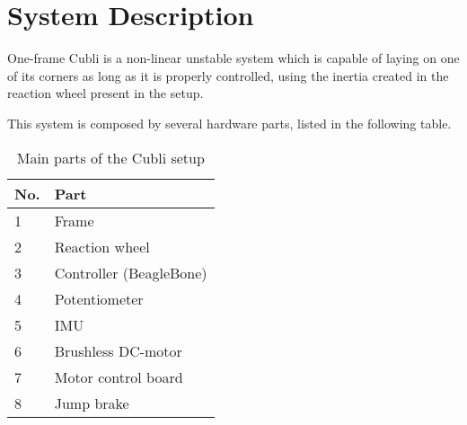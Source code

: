 \chapter{System Description}
One-frame Cubli is a non-linear unstable system which is capable of laying on one of its corners as long as it is properly controlled, using the inertia created in the reaction wheel present in the setup.

This system is composed by several hardware parts, listed in the following table.  

\begin{table}[H]
	\begin{tabular}{|l|p{4.5cm}|}
		\hline %
		\textbf{No.} &\textbf{Part} 			\\
		\hline %
		1            & Frame           			\\
		\hline %
		2            & Reaction wheel      		\\
		\hline %
		3            & Controller (BeagleBone)  \\
		\hline %
		4            & Potentiometer			\\
		\hline %
		5            & IMU          			\\
		\hline %
		6            & Brushless DC-motor   	\\
		\hline %
		7            & Motor control board     	\\
		\hline %
		8            & Jump brake		    	\\
		\hline %
	\end{tabular}
	\caption{Main parts of the Cubli setup}
\label{TableAAUCubliComponent}
\end{table}
